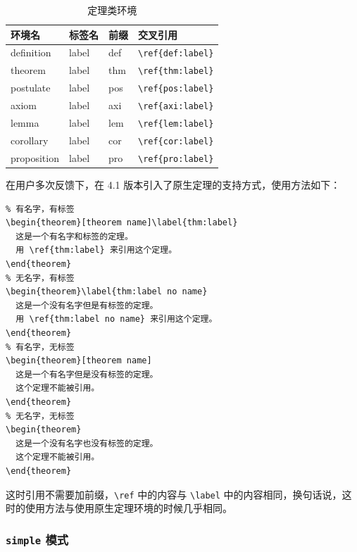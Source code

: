 \documentclass[lang=cn,newtx,10pt,scheme=chinese]{elegantbook}
\begin{document}
\begin{table}[htbp]
  \centering
  \caption{定理类环境}
    \begin{tabular}{llll}
    \toprule
    环境名 & 标签名 & 前缀 & 交叉引用 \\
    \midrule
    definition & label & def   & \lstinline|\ref{def:label}| \\
    theorem & label & thm   & \lstinline|\ref{thm:label}| \\
    postulate & label & pos & \lstinline|\ref{pos:label}| \\
    axiom & label & axi & \lstinline|\ref{axi:label}|\\
    lemma & label & lem   & \lstinline|\ref{lem:label}| \\
    corollary & label & cor   & \lstinline|\ref{cor:label}| \\
    proposition & label & pro   & \lstinline|\ref{pro:label}| \\
    \bottomrule
    \end{tabular}%
  \label{tab:theorem-class}%
\end{table}%

在用户多次反馈下，在 4.1 版本引入了原生定理的支持方式，使用方法如下：

\begin{lstlisting}
% 有名字，有标签
\begin{theorem}[theorem name]\label{thm:label}
  这是一个有名字和标签的定理。
  用 \ref{thm:label} 来引用这个定理。
\end{theorem}
% 无名字，有标签
\begin{theorem}\label{thm:label no name}
  这是一个没有名字但是有标签的定理。
  用 \ref{thm:label no name} 来引用这个定理。
\end{theorem}
% 有名字，无标签
\begin{theorem}[theorem name]
  这是一个有名字但是没有标签的定理。
  这个定理不能被引用。
\end{theorem}
% 无名字，无标签
\begin{theorem}
  这是一个没有名字也没有标签的定理。
  这个定理不能被引用。
\end{theorem}
\end{lstlisting}
这时引用不需要加前缀，\lstinline{\ref} 中的内容与 \lstinline{\label} 中的内容相同，换句话说，这时的使用方法与使用原生定理环境的时候几乎相同。

\subsubsection{\texttt{simple} 模式}
\end{document}
